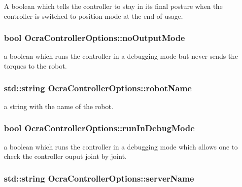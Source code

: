 \-A boolean which tells the controller to stay in its final posture when the controller is switched to position mode at the end of usage. \hypertarget{classOcraControllerOptions_af05db2783f36f469fa535fd4ba5c12b1}{
\subsubsection[{no\-Output\-Mode}]{\setlength{\rightskip}{0pt plus 5cm}bool {\bf \-Ocra\-Controller\-Options\-::no\-Output\-Mode}}}\label{classOcraControllerOptions_af05db2783f36f469fa535fd4ba5c12b1}
a boolean which runs the controller in a debugging mode but never sends the torques to the robot. \hypertarget{classOcraControllerOptions_a897948011f23b08ba20e1707033458d4}{
\subsubsection[{robot\-Name}]{\setlength{\rightskip}{0pt plus 5cm}std\-::string {\bf \-Ocra\-Controller\-Options\-::robot\-Name}}}\label{classOcraControllerOptions_a897948011f23b08ba20e1707033458d4}
a string with the name of the robot. \hypertarget{classOcraControllerOptions_a26dce90c0e6cf7ba608020d01cd08f3c}{
\subsubsection[{run\-In\-Debug\-Mode}]{\setlength{\rightskip}{0pt plus 5cm}bool {\bf \-Ocra\-Controller\-Options\-::run\-In\-Debug\-Mode}}}\label{classOcraControllerOptions_a26dce90c0e6cf7ba608020d01cd08f3c}
a boolean which runs the controller in a debugging mode which allows one to check the controller ouput joint by joint. \hypertarget{classOcraControllerOptions_a22380b083fbf0b202993d0415d1d4c83}{
\subsubsection[{server\-Name}]{\setlength{\rightskip}{0pt plus 5cm}std\-::string {\bf \-Ocra\-Controller\-Options\-::server\-Name}}}\label{classOcraControllerOptions_a22380b083fbf0b202993d0415d1d4c83}
